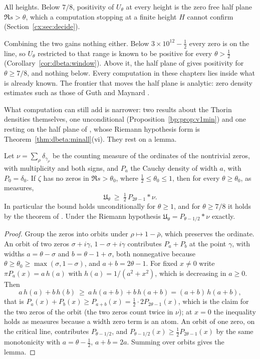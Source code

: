 All heights. Below $7/8$, positivity of $U_\theta$ at every height is the zero free half plane $\Re s>\theta$, which a computation stopping at a finite height $H$ cannot confirm (Section~\ref{cx:sec:decide}).

Combining the two gains nothing either. Below $3\times10^{12}-\tfrac12$ every zero is on the line, so $U_\theta$ restricted to that range is known to be positive for every $\theta>\tfrac12$ (Corollary~\ref{cor:dbeta:window}). Above it, the half plane of \cite{OAI26a} gives positivity for $\theta\ge7/8$, and nothing below. Every computation in these chapters lies inside what is already known. The frontier that moves the half plane is analytic: zero density estimates such as those of Guth and Maynard \cite{GM26}.

What computation can still add is narrower: two results about the Thorin densities themselves, one unconditional (Proposition~\ref{bp:prop:v1min}) and one resting on the half plane of \cite{OAI26a}, whose Riemann hypothesis form is Theorem~\ref{thm:dbeta:minall}(vi). They rest on a lemma.

\begin{lemma}[pairing]\label{cx:lem:pairing}
Let $\nu=\sum_\rho\delta_{\gamma_\rho}$ be the counting measure of the ordinates of the nontrivial zeros, with multiplicity and both signs, and $P_a$ the Cauchy density of width $a$, with $P_0=\delta_0$. If $\zeta$ has no zeros in $\Re s>\theta_0$, where $\tfrac12\le\theta_0\le1$, then for every $\theta\ge\theta_0$, as measures,
\[
\mathfrak U_\theta\ \ge\ \tfrac12\,P_{2\theta-1}*\nu .
\]
In particular the bound holds unconditionally for $\theta\ge1$, and for $\theta\ge7/8$ it holds by the theorem of \cite{OAI26a}. Under the Riemann hypothesis $\mathfrak U_\theta=P_{\theta-1/2}*\nu$ exactly.
\end{lemma}

\begin{proof}
Group the zeros into orbits under $\rho\mapsto1-\bar\rho$, which preserves the ordinate. An orbit of two zeros $\sigma+i\gamma$, $1-\sigma+i\gamma$ contributes $P_a+P_b$ at the point $\gamma$, with widths $a=\theta-\sigma$ and $b=\theta-1+\sigma$, both nonnegative because $\theta\ge\theta_0\ge\max(\sigma,1-\sigma)$, and $a+b=2\theta-1$. For fixed $x\ne0$ write $\pi P_a(x)=a\,h(a)$ with $h(a)=1/(a^2+x^2)$, which is decreasing in $a\ge0$. Then
\[
a\,h(a)+b\,h(b)\ \ge\ a\,h(a+b)+b\,h(a+b)=(a+b)\,h(a+b),
\]
that is $P_a(x)+P_b(x)\ge P_{a+b}(x)=\tfrac12\cdot2P_{2\theta-1}(x)$, which is the claim for the two zeros of the orbit (the two zeros count twice in $\nu$); at $x=0$ the inequality holds as measures because a width zero term is an atom. An orbit of one zero, on the critical line, contributes $P_{\theta-1/2}$, and $P_{\theta-1/2}(x)\ge\tfrac12P_{2\theta-1}(x)$ by the same monotonicity with $a=\theta-\tfrac12$, $a+b=2a$. Summing over orbits gives the lemma.
\end{proof}

